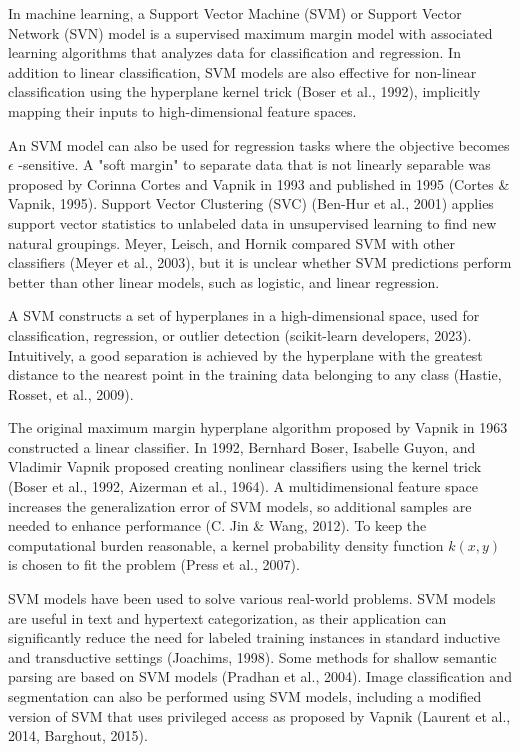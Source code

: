 \documentclass[sn-mathphys-num]{sn-jnl}%
\begin{document}
In machine learning, a Support Vector Machine (SVM) or Support Vector Network (SVN) model is a supervised maximum margin model with associated learning algorithms that analyzes data for classification and regression. In addition to linear classification, SVM models are also effective for non-linear classification using the hyperplane kernel trick (Boser et al., 1992), implicitly mapping their inputs to high-dimensional feature spaces.

An SVM model can also be used for regression tasks where the objective becomes $\epsilon$ -sensitive. A "soft margin" to separate data that is not linearly separable was proposed by Corinna Cortes and Vapnik in 1993 and published in 1995 (Cortes & Vapnik, 1995). Support Vector Clustering (SVC) (Ben-Hur et al., 2001) applies support vector statistics to unlabeled data in unsupervised learning to find new natural groupings. Meyer, Leisch, and Hornik compared SVM with other classifiers (Meyer et al., 2003), but it is unclear whether SVM predictions perform better than other linear models, such as logistic, and linear regression.

A SVM constructs a set of hyperplanes in a high-dimensional space, used for classification, regression, or outlier detection (scikit-learn developers, 2023). Intuitively, a good separation is achieved by the hyperplane with the greatest distance to the nearest point in the training data belonging to any class (Hastie, Rosset, et al., 2009).

The original maximum margin hyperplane algorithm proposed by Vapnik in 1963 constructed a linear classifier. In 1992, Bernhard Boser, Isabelle Guyon, and Vladimir Vapnik proposed creating nonlinear classifiers using the kernel trick (Boser et al., 1992, Aizerman et al., 1964). A multidimensional feature space increases the generalization error of SVM models, so additional samples are needed to enhance performance (C. Jin & Wang, 2012). To keep the computational burden reasonable, a kernel probability density function $k(x, y)$ is chosen to fit the problem (Press et al., 2007).

SVM models have been used to solve various real-world problems. SVM models are useful in text and hypertext categorization, as their application can significantly reduce the need for labeled training instances in standard inductive and transductive settings (Joachims, 1998). Some methods for shallow semantic parsing are based on SVM models (Pradhan et al., 2004). Image classification and segmentation can also be performed using SVM models, including a modified version of SVM that uses privileged access as proposed by Vapnik (Laurent et al., 2014, Barghout, 2015).
\end{document}
